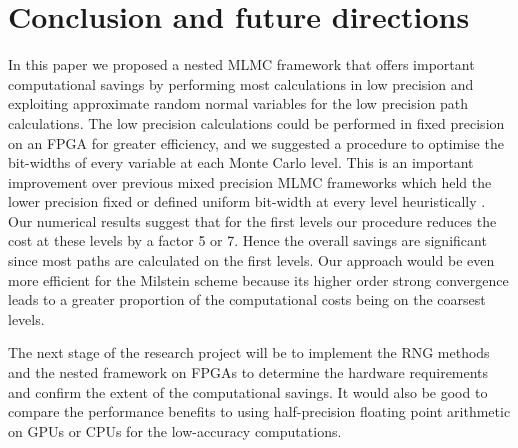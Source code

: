 \section{Conclusion and future directions} \label{sec:conclusion}

In this paper we proposed a nested MLMC framework that offers important computational savings by performing most calculations in low precision and exploiting approximate random normal variables for the low precision path calculations. The low precision calculations could be performed in fixed precision on an FPGA for greater efficiency, and we suggested a procedure to optimise the bit-widths of every variable at each Monte Carlo level. This is an important improvement over previous mixed precision MLMC frameworks which held the lower precision fixed \cite{Rounding_error_oliver} or defined uniform bit-width at every level heuristically \cite{brugger2014mixed}. Our numerical results suggest that for the first levels our procedure reduces the cost at these levels by a factor 5 or 7. Hence the overall savings are significant since most paths are calculated on the first levels. Our approach would be even more efficient for the Milstein scheme because its higher order strong convergence leads to a greater proportion of the computational costs being on the coarsest levels.

The next stage of the research project will be to implement the RNG methods and the nested framework on FPGAs to determine the hardware requirements and confirm the extent of the computational savings. It would also be good to compare the performance benefits to using half-precision floating point arithmetic on GPUs or CPUs for the low-accuracy computations.



